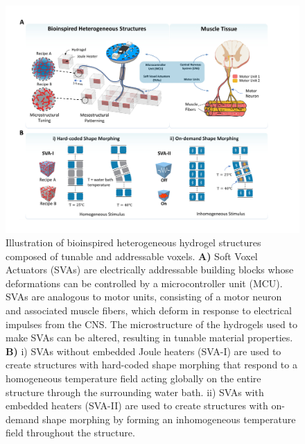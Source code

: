 \begin{figure}[t]
\centering
\includegraphics[width=\textwidth]{fig1.pdf}
\caption[Illustration of bioinspired heterogeneous hydrogel structures]{Illustration of bioinspired heterogeneous hydrogel structures composed of tunable and addressable voxels. \textbf{A)} Soft Voxel Actuators (SVAs) are electrically addressable building blocks whose deformations can be controlled by a microcontroller unit (MCU). SVAs are analogous to motor units, consisting of a motor neuron and associated muscle fibers, which deform in response to electrical impulses from the CNS. The microstructure of the hydrogels used to make SVAs can be altered, resulting in tunable material properties. \textbf{B)} i) SVAs without embedded Joule heaters (SVA-I) are used to create structures with hard-coded shape morphing that respond to a homogeneous temperature field acting globally on the entire structure through the surrounding water bath. ii) SVAs with embedded heaters (SVA-II) are used to create structures with on-demand shape morphing by forming an inhomogeneous temperature field throughout the structure.}
\label{fig:1}
\end{figure}

